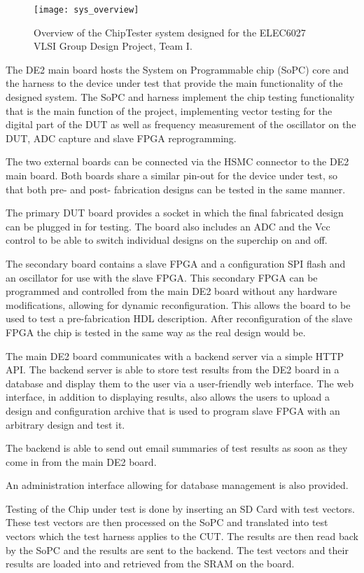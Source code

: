 \begin{figure}[h!]
\centering
\texttt{[image: sys\_overview]}
\caption{Overview of the ChipTester system designed for the ELEC6027 VLSI Group Design Project, Team I.}
\label{fig:intro_sys_overview}
\end{figure}


The DE2 main board hosts the System on Programmable chip (SoPC) core and the harness to
the device under test that provide the main functionality of
the designed system. The SoPC and harness implement
the chip testing functionality that is the main function of the project, implementing
vector testing for the digital part of the DUT as well as frequency measurement of
the oscillator on the DUT, ADC capture and slave FPGA reprogramming.

The two external boards can be connected via the HSMC connector to the DE2 main board.
Both boards share a similar pin-out for the device under test, so that both pre- and post-
fabrication designs can be tested in the same manner.

The primary DUT board provides a socket in which the final fabricated design can
be plugged in for testing. The board also includes an ADC and the Vcc control to be
able to switch individual designs on the superchip on and off.

The secondary board contains a slave FPGA and a configuration SPI flash and an oscillator for
use with the slave FPGA. This secondary FPGA can be programmed and controlled from the
main DE2 board without any hardware modifications, allowing for dynamic reconfiguration.
This allows the board to be used to test a pre-fabrication HDL description.
After reconfiguration of the slave FPGA the chip is tested in the same way as the real
design would be.

The main DE2 board communicates with a backend server via a simple HTTP API. The
backend server is able to store test results from the DE2 board in a database and
display them to the user via a user-friendly web interface. The web interface,
in addition to displaying results, also allows the users to upload a design and configuration
archive that is used to program slave FPGA with an arbitrary design and test it.

The backend is able to send out email summaries of test results as soon as they
come in from the main DE2 board.

An administration interface allowing for database management is also provided.

Testing of the Chip under test is done by inserting an SD Card with test vectors.
These test vectors are then processed on the SoPC and translated into test vectors
which the test harness applies to the CUT. The results are then read back by
the SoPC and the results are sent to the backend. The test vectors and their results
are loaded into and retrieved from the SRAM on the board.








